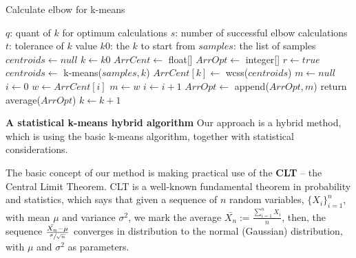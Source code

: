 \documentclass[12pt]{article}
\begin{document}
\begin{algorithm}
\caption{Calculate elbow for k-means}
\begin{algorithmic} 
\REQUIRE
\STATE $q$: quant of $k$ for optimum calculations
\STATE $s$: number of successful elbow calculations
\STATE $t$: tolerance of $k$ value
\STATE $k0$: the $k$ to start from
\STATE $samples$: the list of samples
\ENSURE 
\STATE $centroids \leftarrow null$
\newline
\STATE $k \leftarrow k0$
\newline
\STATE $ArrCent \leftarrow $ float[]
\STATE $ArrOpt \leftarrow $ integer[]
\newline
\STATE $r \leftarrow true$
\newline
{}
\STATE $centroids \leftarrow $ k-means($samples, k$)
\newline
\STATE $ArrCent[k] \leftarrow $ wcss($centroids$)
\newline
{}
\STATE $m \leftarrow null$
\newline
\STATE $i \leftarrow 0$
\STATE $w \leftarrow ArrCent[i]$
\newline
{}
\STATE $m \leftarrow w$
\ENDIF
\newline
\STATE $i \leftarrow i+1$
\ENDWHILE
\STATE $ArrOpt \leftarrow $ append($ArrOpt,m$)
\ENDIF
{}
return average($ArrOpt$)
\ENDIF
\newline
\STATE $k \leftarrow k+1$
\ENDWHILE
\end{algorithmic}
\end{algorithm}

\newpage
\textbf{A statistical k-means hybrid algorithm} \newline
Our approach is a hybrid method, which is using the basic k-means algorithm, together with \newline statistical considerations. \newline

The basic concept of our method is making practical use of the \textbf{CLT} – the Central Limit Theorem. \newline
CLT is a well-known fundamental theorem in probability and statistics, which says that given a sequence of $n$ random variables, \( \{X_i\}_{i=1}^n \), with mean $\mu$ and variance $\sigma^2$, we mark the average 
\( \bar{X_n}:=\frac{\sum_{i=1}^n X_i}{n} \), then,\newline
the sequence \( \frac{\bar{X_n}-\mu}{\sfrac{\sigma}{\sqrt{n}}} \) converges in distribution 
to the normal (Gaussian) distribution, with $\mu$ and $\sigma^2$ as parameters.
\end{document}
